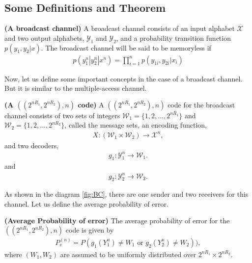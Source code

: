 \subsection{ Some Definitions and Theorem}

\begin{tcolorbox}[boxrule=0pt,frame hidden,sharp corners,enhanced, opacityback=0, borderline west={2pt}{0pt}{red}]
\begin{defn} \textbf{(A broadcast channel)} A broadcast channel consists of an input alphabet $\mathcal{X}$ and two output alphabets, $\mathcal{Y}_1$ and $\mathcal{Y}_2$, and a probability transition function $p(y_1,y_2|x)$. The broadcast channel will be said to be memoryless if
%
\begin{eqnarray}
p(y_1^n|y_2^n|x^n) = \prod_{i=1}^n p(y_{1i}, y_{2i}|x_i)   
\end{eqnarray}
%
\end{defn}
\end{tcolorbox}
%
Now, let us define some important concepts in the case of a broadcast channel. But it is similar to the multiple-access channel. 
%
\begin{tcolorbox}[boxrule=0pt,frame hidden,sharp corners,enhanced, opacityback=0, borderline west={2pt}{0pt}{red}]
\begin{defn} \textbf{(A $((2^{nR_1},2^{nR_2}),n)$ code)} A $((2^{nR_1},2^{nR_2}),n)$ code for the broadcast channel consists of two sets of integers $\mathcal{W}_1 = \{1,2,...,2^{nR_1} \}$ and $\mathcal{W}_2 = \{1,2,...,2^{nR_2} \}$, called the message sets, an encoding function,
%
\begin{eqnarray}
    X: (\mathcal{W}_1 \times \mathcal{W}_2) \rightarrow \mathcal{X}^n,
\end{eqnarray}
%
and two decoders,
%
\begin{eqnarray}
    g_1: \mathcal{Y}_1^n \rightarrow \mathcal{W}_1.
\end{eqnarray}
%
and
%
\begin{eqnarray}
    g_2: \mathcal{Y}_2^n \rightarrow \mathcal{W}_2.
\end{eqnarray}
%
\end{defn}
\end{tcolorbox}
%
As shown in the diagram \ref{fig:BC}, there are one sender and two receivers for this channel. Let us define the average probability of error.
%
\begin{tcolorbox}[boxrule=0pt,frame hidden,sharp corners,enhanced, opacityback=0, borderline west={2pt}{0pt}{red}]
\begin{defn} \textbf{(Average Probability of error)} The average probability of error for the $((2^{nR_1},2^{nR_2}),n)$ code is given by
%
\begin{eqnarray}
    P_e^{(n)} = P(g_1(Y^n_1) \neq W_1 \text{ or } g_2(Y^n_2) \neq W_2)),
\end{eqnarray}
%
where $(W_1, W_2)$ are assumed to be uniformly distributed over $2^{nR_1}\times 2^{nR_2}$.
\end{defn}
\end{tcolorbox}
